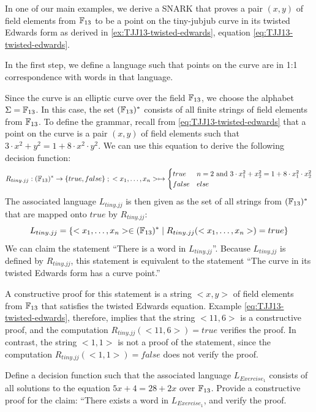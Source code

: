\begin{example}\label{ex:tiny-jubjub} In one of our main examples, we derive a SNARK that proves a pair $(x,y)$ of field elements from $\mathbb{F}_{13}$ to be a point on the tiny-{jubjub} curve in its twisted Edwards form as derived in \examplename{} \ref{ex:TJJ13-twisted-edwards}, equation \ref{eq:TJJ13-twisted-edwards}.

In the first step, we define a language such that points on the  curve are in 1:1 correspondence with words in that language.

Since the  curve is an elliptic curve over the field $\mathbb{F}_{13}$, we choose the alphabet $\Sigma = \mathbb{F}_{13}$. In this case, the set $(\mathbb{F}_{13})^*$ consists of all finite strings of field elements from $\mathbb{F}_{13}$. To define the grammar, recall from \eqref{eq:TJJ13-twisted-edwards} that a point on the  curve is a pair $(x,y)$ of field elements such that $3\cdot x^2 + y^2 = 1+ 8\cdot x^2\cdot y^2$. We can use this equation to derive the following decision function:
$$
R_{tiny.jj} : (\mathbb{F}_{13})^* \to \{true, false\}\;;\;
<x_1,\ldots,x_n> \mapsto
\begin{cases}
true & n=2 \text{ and } 3\cdot x_1^2 + x_2^2 = 1+ 8\cdot x_1^2\cdot x_2^2\\
false & else
\end{cases}
$$
The associated language $L_{tiny.jj}$ is then given as the set of all strings from $(\mathbb{F}_{13})^*$ that are mapped onto $true$ by $R_{tiny.jj}$:
$$
L_{tiny.jj} = \{<x_1,\ldots,x_n>\in (\mathbb{F}_{13})^*\;|\; R_{tiny.jj}(<x_1,\ldots,x_n>)=true \}
$$
We can claim the statement ``There is a word in $L_{tiny.jj}$''. Because $L_{tiny.jj}$ is defined by $R_{tiny.jj}$, this statement is equivalent to the statement ``The  curve in its twisted Edwards form has a curve point.'' 

A constructive proof for this statement is a string $<x,y>$ of field elements from $\mathbb{F}_{13}$ that satisfies the twisted Edwards equation. Example \eqref{eq:TJJ13-twisted-edwards}, therefore, implies that the string $<11,6>$ is a constructive proof, and the computation $R_{tiny.jj}(<11,6>)=true$ verifies the proof. In contrast, the string $<1,1>$ is not a proof of the statement, since the computation $R_{tiny.jj}(<1,1>)=false$ does not verify the proof.
\end{example}
\begin{exercise}
\label{ex:decision_function_1} Define a decision function such that the associated language $L_{Exercise_1}$ consists of all solutions to the equation $5x + 4 = 28 + 2x$ over $\mathbb{F}_{13}$. Provide a constructive proof for the claim: ``There exists a word in $L_{Exercise_1}$, and verify the proof.  
\end{exercise}
